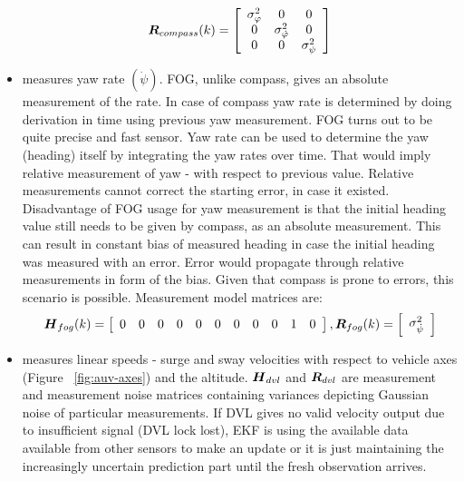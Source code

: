 \begin{itemize}
\begin{equation}
\boldsymbol{R}_{compass}(k) =
\left[ \begin{array}{ccc}
\sigma_{\varphi}^{2} & 0 & 0 \\
0 & \sigma_{\dot{\varphi}}^{2} & 0 \\
0 &     0          & \sigma_{\psi}^{2} \end{array} \right]
\end{equation}
\item {}
measures yaw rate $(\dot{\psi})$. FOG, unlike compass, gives an absolute measurement of the rate. In case of compass yaw rate is determined by doing derivation in time using previous yaw measurement. FOG turns out to be quite precise and fast sensor. Yaw rate can be used to determine the yaw (heading) itself by integrating the yaw rates over time. That would imply relative measurement of yaw - with respect to previous value. Relative measurements cannot correct the starting error, in case it existed.  Disadvantage of FOG usage for yaw measurement is that the initial heading value still needs to be given by compass, as an absolute measurement. This can result in constant bias of measured heading in case the initial heading was measured with an error. Error would propagate through relative measurements in form of the bias. Given that compass is prone to errors, this scenario is possible. Measurement model matrices are:
\begin{equation}
\label{eq:fog-mes}
\boldsymbol{H}_{fog}(k) = 
\left[ \begin{array}{ccccccccccc}
0 & 0 & 0 & 0 & 0 & 0 & 0 & 0 & 0 & 1 & 0  \end{array} \right], 
\boldsymbol{R}_{fog}(k) =
\left[ \begin{array}{c}
\sigma_{\dot{\psi}}^{2} \end{array} \right]
\end{equation}  
\item {}
measures linear speeds - surge and sway velocities with respect to vehicle axes (Figure ~\ref{fig:auv-axes}) and the altitude. $\boldsymbol{H}_{dvl}$ and $\boldsymbol{R}_{dvl}$ are measurement and measurement noise matrices containing variances depicting Gaussian noise of particular measurements. If DVL gives no valid velocity output due to insufficient signal (DVL lock lost), EKF is using the available data available from other sensors to make an update or it is just maintaining the increasingly uncertain prediction part until the fresh observation arrives.    
\begin{equation}

\end{equation}
\end{itemize}
